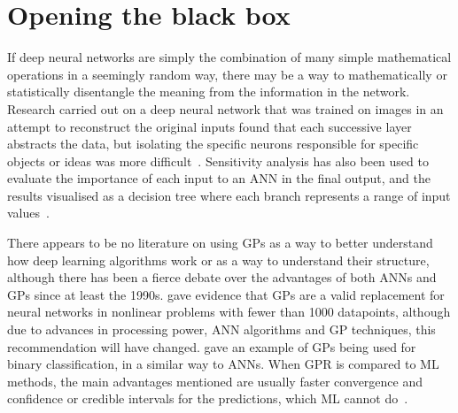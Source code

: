 
\section{Opening the black box}

If deep neural networks are simply the combination of many simple mathematical operations in a seemingly random way, there may be a way to mathematically or statistically disentangle the meaning from the information in the network.
Research carried out on  a deep neural network that was trained on images in an attempt to reconstruct the original inputs found that each successive layer abstracts the data, but isolating the specific neurons responsible for specific objects or ideas was more difficult~\autocite{mahendran2014}.
Sensitivity analysis has also been used to evaluate the importance of each input to an \ac{ANN} in the final output, and the results visualised as a decision tree where each branch represents a range of input values~\autocite[13]{cortez2013}.

There appears to be no literature on using \acp{GP} as a way to better understand how deep learning algorithms work or as a way to understand their structure, although there has been a fierce debate over the advantages of both \acp{ANN} and \acp{GP} since at least the 1990s.
\textcite[65--66]{rasmussen1997} gave evidence that \acp{GP} are a valid replacement for neural networks in nonlinear problems with fewer than 1000 datapoints, although due to advances in processing power, \ac{ANN} algorithms and \ac{GP} techniques, this recommendation will have changed.
\textcite[25]{mackay1997} gave an example of \acp{GP} being used for binary classification, in a similar way to \acp{ANN}.
When \ac{GPR} is compared to ML methods, the main advantages mentioned are usually faster convergence and confidence or credible intervals for the predictions, which ML cannot do~\autocite{herbrich2003}.
